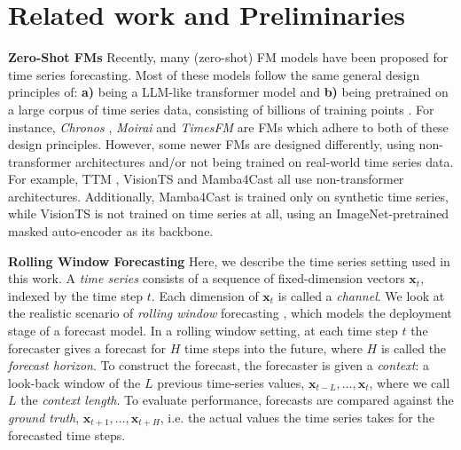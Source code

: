 \section{Related work and Preliminaries}
\label{sec:preliminaries}
\textbf{Zero-Shot FMs} \; Recently, many (zero-shot) FM models have been proposed for time series forecasting. Most of these models follow the same general design principles of: \textbf{a)} being a LLM-like transformer model and \textbf{b)} being pretrained on a large corpus of time series data, consisting of billions of training points \citep{rasul2023lag,chen2024visionts,liang2024foundation}. For instance, \textit{Chronos} \citep{Ansari2024Chronos}, \textit{Moirai} \citep{Woo2024moirai} and \textit{TimesFM} \citep{Das2024TimesFM} are FMs which adhere to both of these design principles. However, some newer FMs are designed differently, using non-transformer architectures and/or not being trained on real-world time series data. For example, TTM \citep{Ekambaram2024Tiny}, VisionTS \citep{chen2024visionts} and Mamba4Cast \citep{bhethanabhotlamamba4cast} all use non-transformer architectures. Additionally, Mamba4Cast is trained only on synthetic time series, while VisionTS is not trained on time series at all, using an ImageNet-pretrained masked auto-encoder \citep{he2022masked} as its backbone. 

\textbf{Rolling Window Forecasting} \; Here, we describe the time series setting used in this work. A \emph{time series} consists of a sequence of fixed-dimension vectors $\bm{x}_t$, indexed by the time step $t$. Each dimension of $\bm{x}_t$ is called a \emph{channel}. We look at the realistic scenario of \textit{rolling window} forecasting \citep{nie2022time}, which models the deployment stage of a forecast model. In a rolling window setting, at each time step $t$ the forecaster gives a forecast for $H$ time steps into the future, where $H$ is called the \emph{forecast horizon}. To construct the forecast, the forecaster is given a \emph{context}: a look-back window of the $L$ previous time-series values, $\bm{x}_{t-L}, \ldots, \bm{x}_t$, where we call $L$ the \emph{context length}. To evaluate performance, forecasts are compared against the \emph{ground truth}, $\bm{x}_{t+1}, \ldots, \bm{x}_{t+H}$, i.e. the actual values the time series takes for the forecasted time steps.